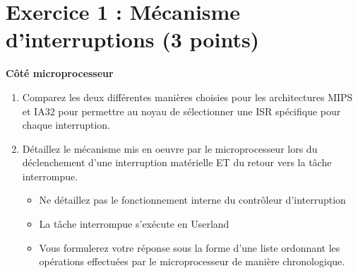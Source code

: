 \section*{Exercice 1 : M\'ecanisme d'interruptions (3 points)}

{\bf C\^ot\'e microprocesseur}

\begin{enumerate}
\item Comparez les deux diff\'erentes mani\`eres choisies pour les architectures MIPS et IA32 pour permettre au noyau de s\'electionner une ISR sp\'ecifique pour chaque interruption.
\item D\'etaillez le m\'ecanisme mis en oeuvre par le microprocesseur lors du d\'eclenchement d'une interruption mat\'erielle ET du retour vers la t\^ache interrompue.

\begin{itemize}
\item Ne d\'etaillez pas le fonctionnement interne du contr\^oleur d'interruption
\item La t\^ache interrompue s'ex\'ecute en Userland
\item Vous formulerez votre r\'eponse sous la forme d'une liste ordonnant les op\'erations effectu\'ees par le microprocesseur de mani\`ere chronologique.
\end{itemize}

\end{enumerate}

